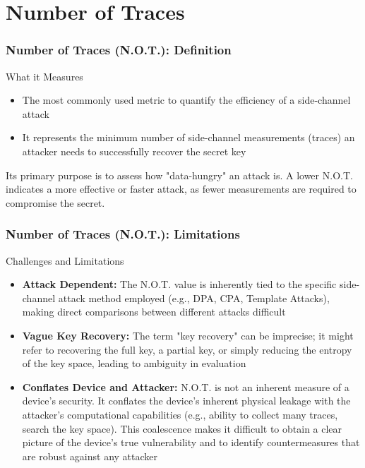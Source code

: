 \section{Number of Traces}

\begin{frame}
    \frametitle{Number of Traces (N.O.T.): Definition}
    \begin{block}{What it Measures}
        \begin{itemize}
            \item The most commonly used metric to quantify the efficiency of a side-channel attack
            \item It represents the minimum number of side-channel measurements (traces) an attacker needs to successfully recover the secret key
        \end{itemize}
    \end{block}

\newline
    Its primary purpose is to assess how "data-hungry" an attack is. \newline \newline
    A lower N.O.T. indicates a more effective or faster attack, as fewer measurements are required to compromise the secret. \newline \newline
       
        
    
\end{frame}


\begin{frame}
    \frametitle{Number of Traces (N.O.T.): Limitations}
    \begin{block}{Challenges and Limitations}
        \begin{itemize}
            \item \textbf{Attack Dependent:} The N.O.T. value is inherently tied to the specific side-channel attack method employed (e.g., DPA, CPA, Template Attacks), making direct comparisons between different attacks difficult
            \item \textbf{Vague Key Recovery:} The term "key recovery" can be imprecise; it might refer to recovering the full key, a partial key, or simply reducing the entropy of the key space, leading to ambiguity in evaluation
            \item \textbf{Conflates Device and Attacker:} N.O.T. is not an inherent measure of a device's security. It conflates the device's inherent physical leakage with the attacker's computational capabilities (e.g., ability to collect many traces, search the key space). This coalescence makes it difficult to obtain a clear picture of the device's true vulnerability and to identify countermeasures that are robust against any attacker

        \end{itemize}
    \end{block}
\end{frame}